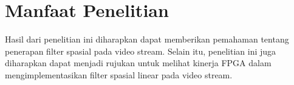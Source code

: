 \section{Manfaat Penelitian}
Hasil dari penelitian ini diharapkan dapat memberikan pemahaman tentang penerapan filter spasial pada video stream. Selain itu, penelitian ini juga diharapkan dapat menjadi rujukan untuk melihat kinerja FPGA dalam mengimplementasikan filter spasial linear pada video stream.
